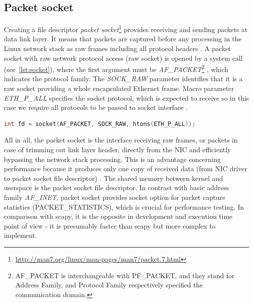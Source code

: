 \documentclass[12pt,a4paper,twoside]{book}
\begin{document}
        \subsection{Packet socket} \label{analysis:mechs:socket}
            Creating a file descriptor \emph{packet socket}\footnote{\url{http://man7.org/linux/man-pages/man7/packet.7.html}} provides receiving and sending packets at data link layer. It means that packets are captured before any processing in the Linux network stack as raw frames including all protocol headers \cite{man:packet}. A packet socket with raw network protocol access (raw socket) is opened by a system call (see~\autoref{lst:socket}), where the first argument must be \emph{AF\_PACKET}\footnote{AF\_PACKET is interchangeable with PF\_PACKET, and they stand for Address Family, and Protocol Family respectively specified the communication domain.\cite{man:socket}} \cite{man:socket}, which indicates the protocol family. The \emph{SOCK\_RAW} parameter identifies that it is a raw socket providing a whole encapsulated Ethernet frame. Macro parameter \emph{ETH\_P\_ALL} specifies the socket protocol, which is expected to receive so in this case we require all protocols to be passed to socket interface \cite{man:packet}.
            \begin{lstlisting}[language=C, style=appendix, caption=Raw socket system call., label=lst:socket]
int fd = socket(AF_PACKET, SOCK_RAW, htons(ETH_P_ALL));
            \end{lstlisting}
            \par
            All in all, the packet socket is the interface receiving raw frames, or packets in case of trimming out link layer header, directly from the NIC and efficiently bypassing the network stack processing. This is an advantage concerning performance because it produces only one copy of received data (from NIC driver to packet socket file descriptor) \cite{thesis:muni}\cite{web:raw_socket}. The shared memory between kernel and userspace is the packet socket file descriptor. In contrast with basic address family \emph{AF\_INET}, packet socket provides socket option for packet capture statistics (PACKET\_STATISTICS), which is crucial for performance testing. In comparison with scapy, it is the opposite in development and execution time point of view - it is presumably faster than scapy but more complex to implement.\par
\end{document}
